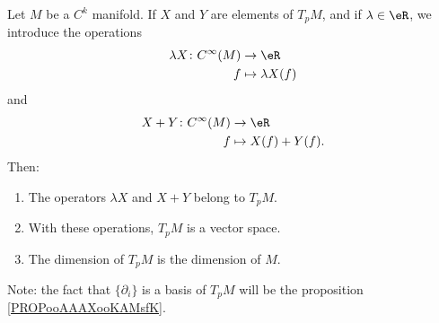 \begin{definition}		\label{DEFooRNPJooHpUDTi} \label{PROPooEJBWooSbvypo}
	Let \( M\) be a \( C^k\) manifold. If \( X\) and \( Y \) are elements of \( T_pM\), and if \( \lambda\in \eR\), we introduce the operations
	\begin{equation}
		\begin{aligned}
			\lambda X\colon  C^{\infty}(M) & \to \eR              \\
			f                              & \mapsto \lambda X(f)
		\end{aligned}
	\end{equation}
	and
	\begin{equation}
		\begin{aligned}
			X+Y\colon  C^{\infty}(M) & \to \eR            \\
			f                        & \mapsto X(f)+Y(f).
		\end{aligned}
	\end{equation}
	Then:
	\begin{enumerate}
		\item
		      The operators \( \lambda X\) and \( X+Y\) belong to \( T_pM\).
		\item
		      With these operations, \( T_pM\) is a vector space.
		\item		\label{ITEMooJEYEooLuJiqz}
		      The dimension of \( T_pM\) is the dimension of \( M\).
	\end{enumerate}
\end{definition}

Note: the fact that \( \{ \partial_i \}\) is a basis of \( T_pM\) will be the proposition \ref{PROPooAAAXooKAMsfK}.

